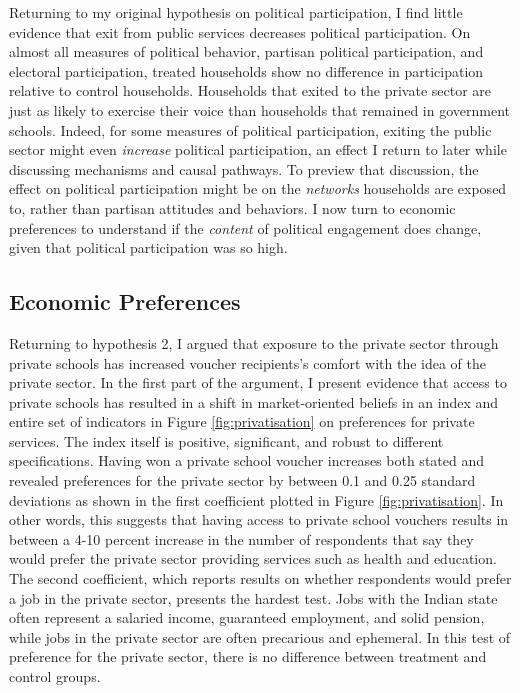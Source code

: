 \documentclass[hidelinks, 12pt, titlepage]{article}
\begin{document}
		Returning to my original hypothesis on political participation, I find little evidence that exit from public services decreases political participation.  On almost all measures of political behavior, partisan political participation, and electoral participation, treated households show no difference in participation relative to control households.  Households that exited to the private sector are just as likely to exercise their voice than households that remained in government schools.  Indeed, for some measures of political participation, exiting the public sector might even \emph{increase} political participation, an effect I return to later while discussing mechanisms and causal pathways.  To preview that discussion, the effect on political participation might be on the \emph{networks} households are exposed to, rather than partisan attitudes and behaviors.  I now turn to economic preferences to understand if the \emph{content} of political engagement does change, given that political participation was so high.

\subsection*{Economic Preferences}

Returning to hypothesis 2, I argued that exposure to the private sector through private schools has increased voucher recipients's comfort with the idea of the private sector.  In the first part of the argument, I present evidence that access to private schools has resulted in a shift in market-oriented beliefs in an index and entire set of indicators in Figure \ref{fig:privatisation} on preferences for private services.  The index itself is positive, significant, and robust to different specifications.  Having won a private school voucher increases both stated and revealed preferences for the private sector by between 0.1 and 0.25 standard deviations as shown in the first coefficient plotted in Figure \ref{fig:privatisation}.  In other words, this suggests that having access to private school vouchers results in between a 4-10 percent increase in the number of respondents that say they would prefer the private sector providing services such as health and education.  The second coefficient, which reports results on whether respondents would prefer a job in the private sector, presents the hardest test.  Jobs with the Indian state often represent a salaried income, guaranteed employment, and solid pension, while jobs in the private sector are often precarious and ephemeral. In this test of preference for the private sector, there is no difference between treatment and control groups.
\end{document}

